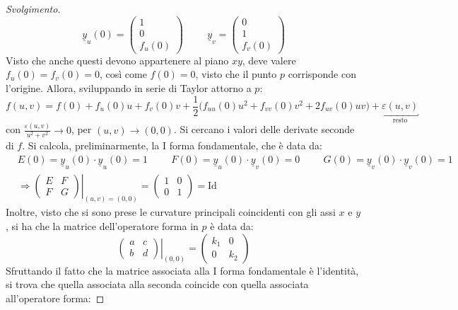 \documentclass[12pt]{scrartcl}
\theoremstyle{style}
\newenvironment{svolgimento}{\renewcommand\qedsymbol{$\blacksquare$}\begin{proof}[Svolgimento]}{\end{proof}}
\newcommand*\Eval[3]{\left.#1\right\rvert_{#2}^{#3}}
\numberwithin{equation}{subsection}
\begin{document}
\begin{svolgimento}
	\[
	\underline{y}_u(0) = \begin{pmatrix} 1 \\ 0 \\ f_u(0) \end{pmatrix} \hspace{1cm} \underline{y}_v = \begin{pmatrix} 0 \\ 1 \\ f_v(0) \end{pmatrix} 
	\] 
	Visto che anche questi devono appartenere al piano $xy$, deve valere $f_u(0) = f_v(0) = 0$, cos\`i come $f(0) = 0$, visto che il punto $p$ corrisponde con l'origine.
	Allora, sviluppando in serie di Taylor attorno a $p$:
	\[
		f(u,v) = f(0) + f_u(0)u + f_v(0) v+ \frac{1}{2} \big(f_{uu} (0)u^2 + f_{vv} (0) v^2 + 2f_{uv} (0) uv\big) + \underbracket{\varepsilon (u,v)}_{\text{resto}} 
	\] 
con $\frac{\varepsilon (u,v)}{u^2 + v^2}\to 0$, per $(u,v) \to (0,0)$.	
Si cercano i valori delle derivate seconde di $f$.
Si calcola, preliminarmente, la I forma fondamentale, che \`e data da:
\[
	\begin{split}
		&E(0) = \underline{y}_u (0) \cdot \underline{y}_u (0) = 1 \hspace{1cm}F(0) = \underline{y}_u(0) \cdot \underline{y}_v(0) = 0 \hspace{1cm}G(0) = \underline{y}_v(0) \cdot \underline{y}_v(0) = 1\\
		&\Eval{\Rightarrow \begin{pmatrix} E & F \\  F&G \end{pmatrix} }{(u,v)=(0,0)}{} = \begin{pmatrix} 1 & 0 \\ 0 & 1 \end{pmatrix} = \mathrm{Id} 
	\end{split}
\] 
Inoltre, visto che si sono prese le curvature principali coincidenti con gli assi $x$ e $y$, si ha che la matrice dell'operatore forma in $p$ \`e data da:
\[
	\Eval{\begin{pmatrix} a & c \\ b & d \end{pmatrix} }{(0,0)}{} = \begin{pmatrix} k_1 & 0 \\ 0 & k_2 \end{pmatrix} 
\] 
Sfruttando il fatto che la matrice associata alla I forma fondamentale \`e l'identit\`a, si trova che quella associata alla seconda coincide con quella associata all'operatore forma:

\end{svolgimento}
\end{document}
